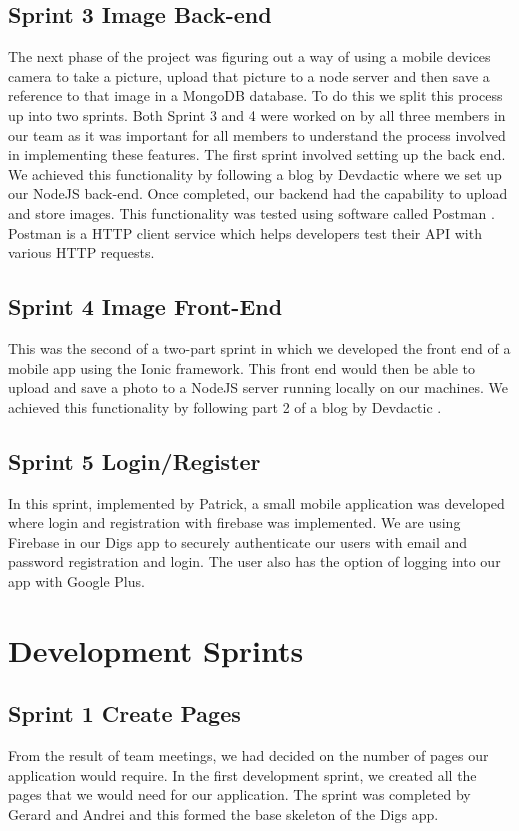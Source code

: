 \subsection{Sprint 3 Image Back-end}
The next phase of the project was figuring out a way of using a mobile devices camera to take a picture, upload that picture to a node server and then save a reference to that image in a MongoDB database. To do this we split this process up into two sprints. Both Sprint 3 and 4 were worked on by all three members in our team as it was important for all members to understand the process involved in implementing these features. The first sprint involved setting up the back end. We achieved this functionality by following a blog by Devdactic \cite{ImageBackEnd} where we set up our NodeJS back-end. Once completed, our backend had the capability to upload and store images. This functionality was tested using software called Postman \cite{Postman}. Postman is a HTTP client service which helps developers test their API with various HTTP requests.

\subsection{Sprint 4 Image Front-End}
This was the second of a two-part sprint in which we developed the front end of a mobile app using the Ionic framework. This front end would then be able to upload and save a photo to a NodeJS server running locally on our machines. We achieved this functionality by following part 2 of a blog by Devdactic  \cite{ImageFrontEnd}. 

\subsection{Sprint 5 Login/Register}
In this sprint, implemented by Patrick, a small mobile application was developed where login and registration with firebase was implemented. We are using Firebase in our Digs app to securely authenticate our users with email and password registration and login. The user also has the option of logging into our app with Google Plus.

\section{Development Sprints}\label{development_sprints}
\subsection{Sprint 1 Create Pages}
From the result of team meetings, we had decided on the number of pages our application would require. In the first development sprint, we created all the pages that we would need for our application. The sprint was completed by Gerard and Andrei and this formed the base skeleton of the Digs app.

